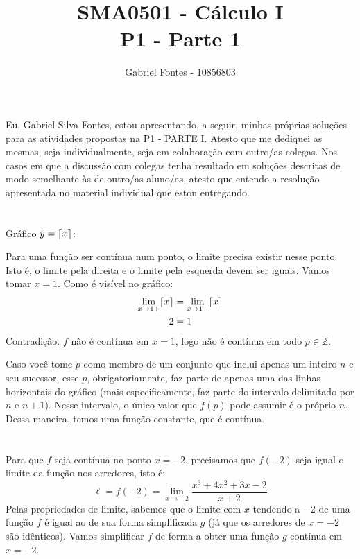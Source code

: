 \documentclass[12pt]{article}
\title{SMA0501 - Cálculo I \\ P1 - Parte 1}%
\author{Gabriel Fontes - 10856803}%
\DeclarePairedDelimiter{\ceil}{\lceil}{\rceil}
\begin{document}
\maketitle
Eu, Gabriel Silva Fontes, estou apresentando, a seguir, minhas próprias soluções para as atividades propostas na P1 - PARTE I. %
Atesto que me dediquei as mesmas, seja individualmente, seja em colaboração com outro/as colegas.
Nos casos em que a discussão com colegas tenha resultado em soluções descritas de modo semelhante às de outro/as aluno/as, atesto que entendo a resolução apresentada no material individual que estou entregando.
\section{}
Gráfico \(y = \ceil{x}\):


\bigskip
\bigskip
\bigskip
\bigskip
\bigskip
\bigskip

Para uma função ser contínua num ponto, o limite precisa existir nesse ponto. Isto é, o limite pela direita e o limite pela esquerda devem ser iguais. Vamos tomar \(x=1\). Como é visível no gráfico:
\begin{align*}
	\lim_{x\rightarrow 1+} \ceil{x} &= \lim_{x\rightarrow 1-} \ceil{x} \\
	2 &= 1
\end{align*}
Contradição. \(f\) não é contínua em \(x=1\), logo não é contínua em todo \(p \in \mathbb{Z}\).

Caso você tome \(p\) como membro de um conjunto que inclui apenas um inteiro \(n\) e seu sucessor, esse \(p\), obrigatoriamente, faz parte de apenas uma das linhas horizontais do gráfico (mais especificamente, faz parte do intervalo delimitado por \(n\) e \(n+1\)). Nesse intervalo, o único valor que \(f(p)\) pode assumir é o próprio \(n\). Dessa maneira, temos uma função constante, que é contínua.

\section{}
Para que \(f\) seja contínua no ponto \(x=-2\), precisamos que \(f(-2)\) seja igual o limite da função nos arredores, isto é:
\[
	\ell = f(-2) = \lim_{x\rightarrow -2} \frac{x^3 + 4x^2 + 3x - 2}{x+2}
\] 
Pelas propriedades de limite, sabemos que o limite com \(x\) tendendo a \(-2\) de uma função \(f\) é igual ao de sua forma simplificada \(g\) (já que os arredores de \(x = -2\) são idênticos). Vamos simplificar \(f\) de forma a obter uma função \(g\) contínua em \(x=-2\).
\end{document}
